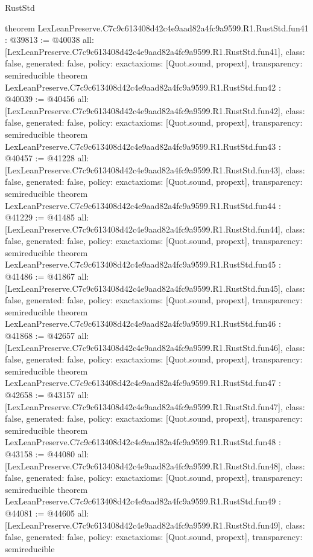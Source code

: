 \begin{lexlean}{RustStd}
\begin{coremodule}
{}
theorem LexLeanPreserve.C7c9c613408d42c4e9aad82a4fc9a9599.R1.RustStd.fun41 : @39813 := @40038 {
  all: [LexLeanPreserve.C7c9c613408d42c4e9aad82a4fc9a9599.R1.RustStd.fun41],
  class: false,
  generated: false,
  policy: exact{axioms: [Quot.sound, propext]},
  transparency: semireducible
}
theorem LexLeanPreserve.C7c9c613408d42c4e9aad82a4fc9a9599.R1.RustStd.fun42 : @40039 := @40456 {
  all: [LexLeanPreserve.C7c9c613408d42c4e9aad82a4fc9a9599.R1.RustStd.fun42],
  class: false,
  generated: false,
  policy: exact{axioms: [Quot.sound, propext]},
  transparency: semireducible
}
theorem LexLeanPreserve.C7c9c613408d42c4e9aad82a4fc9a9599.R1.RustStd.fun43 : @40457 := @41228 {
  all: [LexLeanPreserve.C7c9c613408d42c4e9aad82a4fc9a9599.R1.RustStd.fun43],
  class: false,
  generated: false,
  policy: exact{axioms: [Quot.sound, propext]},
  transparency: semireducible
}
theorem LexLeanPreserve.C7c9c613408d42c4e9aad82a4fc9a9599.R1.RustStd.fun44 : @41229 := @41485 {
  all: [LexLeanPreserve.C7c9c613408d42c4e9aad82a4fc9a9599.R1.RustStd.fun44],
  class: false,
  generated: false,
  policy: exact{axioms: [Quot.sound, propext]},
  transparency: semireducible
}
theorem LexLeanPreserve.C7c9c613408d42c4e9aad82a4fc9a9599.R1.RustStd.fun45 : @41486 := @41867 {
  all: [LexLeanPreserve.C7c9c613408d42c4e9aad82a4fc9a9599.R1.RustStd.fun45],
  class: false,
  generated: false,
  policy: exact{axioms: [Quot.sound, propext]},
  transparency: semireducible
}
theorem LexLeanPreserve.C7c9c613408d42c4e9aad82a4fc9a9599.R1.RustStd.fun46 : @41868 := @42657 {
  all: [LexLeanPreserve.C7c9c613408d42c4e9aad82a4fc9a9599.R1.RustStd.fun46],
  class: false,
  generated: false,
  policy: exact{axioms: [Quot.sound, propext]},
  transparency: semireducible
}
theorem LexLeanPreserve.C7c9c613408d42c4e9aad82a4fc9a9599.R1.RustStd.fun47 : @42658 := @43157 {
  all: [LexLeanPreserve.C7c9c613408d42c4e9aad82a4fc9a9599.R1.RustStd.fun47],
  class: false,
  generated: false,
  policy: exact{axioms: [Quot.sound, propext]},
  transparency: semireducible
}
theorem LexLeanPreserve.C7c9c613408d42c4e9aad82a4fc9a9599.R1.RustStd.fun48 : @43158 := @44080 {
  all: [LexLeanPreserve.C7c9c613408d42c4e9aad82a4fc9a9599.R1.RustStd.fun48],
  class: false,
  generated: false,
  policy: exact{axioms: [Quot.sound, propext]},
  transparency: semireducible
}
theorem LexLeanPreserve.C7c9c613408d42c4e9aad82a4fc9a9599.R1.RustStd.fun49 : @44081 := @44605 {
  all: [LexLeanPreserve.C7c9c613408d42c4e9aad82a4fc9a9599.R1.RustStd.fun49],
  class: false,
  generated: false,
  policy: exact{axioms: [Quot.sound, propext]},
  transparency: semireducible
}
\end{coremodule}
\end{lexlean}
